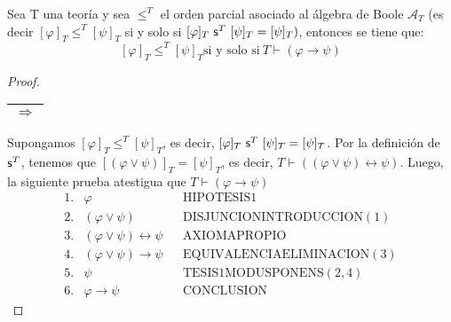   \begin{lemma} \label{lemma_77}
    \PN Sea T una teoría y sea $\leq^{T}$ el orden parcial asociado al álgebra de Boole $\mathcal{A}_{T}$ (es decir
    $[\varphi]_{T} \leq^{T} [\psi]_{T}$ si y solo si $[\varphi]_{T} \ \SU^{T} \ [\psi]_{T} = [\psi]_{T})$, entonces se
    tiene que:
    \[
      [\varphi]_{T} \leq^{T} [\psi]_{T} \text{si y solo si} \ T \vdash (\varphi \rightarrow \psi)
    \]
  \end{lemma}
  \begin{proof}
    \PN \begin{tabular}{|c|} \hline $\Rightarrow$ \\\hline \end{tabular} Supongamos $[\varphi]_{T} \leq^{T} [\psi]_{T}$,
    es decir, $[\varphi]_{T} \ \SU^{T} \ [\psi]_{T} = [\psi]_{T}$. Por la definición de $\mathsf{s}^{T}$, tenemos que
    $[(\varphi \vee \psi)]_{T} = [\psi]_{T}$, es decir, $T \vdash ((\varphi \vee \psi) \leftrightarrow \psi)$. Luego, la
    siguiente prueba atestigua que $T \vdash (\varphi \rightarrow \psi)$
    \[
      \begin{array}{llll}
        1. & \varphi && \text{HIPOTESIS1} \\
        2. & (\varphi \vee \psi) && \text{DISJUNCIONINTRODUCCION}(1) \\
        3. & (\varphi \vee \psi) \leftrightarrow \psi && \text{AXIOMAPROPIO} \\
        4. & (\varphi \vee \psi) \rightarrow \psi && \text{EQUIVALENCIAELIMINACION}(3) \\
        5. & \psi && \text{TESIS1MODUSPONENS}(2,4) \\
        6. & \varphi \rightarrow \psi && \text{CONCLUSION}
      \end{array}
    \]


\end{proof}
